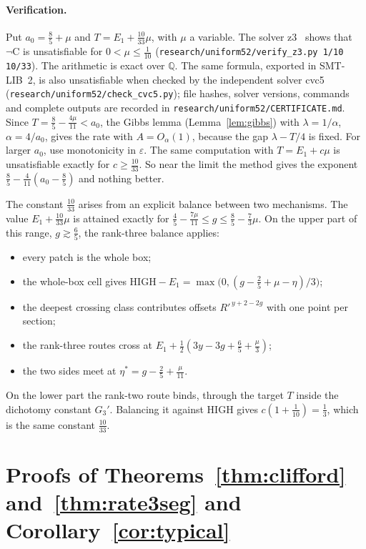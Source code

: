 \documentclass[aps,prx,twocolumn,superscriptaddress,nofootinbib,longbibliography]{revtex4-2}
\theoremstyle{plain}
\theoremstyle{definition}
\theoremstyle{remark}
\newcommand{\Q}{\mathbb{Q}}
\begin{document}
\paragraph{Verification.} Put $a_0=\tfrac85+\mu$ and $T=E_1+\tfrac{10}{33}\mu$, with $\mu$ a variable.
The solver z3~\cite{Z3} shows that $\neg\mathrm C$ is unsatisfiable for $0<\mu\le\tfrac1{10}$
(\texttt{research/uniform52/verify\_z3.py 1/10 10/33}). The arithmetic is exact over $\Q$. The same formula, exported in SMT-LIB~2, is also unsatisfiable when checked by the independent solver cvc5 (\texttt{research/uniform52/check\_cvc5.py}); file hashes, solver versions, commands and complete outputs are recorded in \texttt{research/uniform52/CERTIFICATE.md}. Since $T=\tfrac85-\tfrac{4\mu}{11}<a_0$, the Gibbs lemma
(Lemma~\ref{lem:gibbs}) with $\lambda=1/\alpha$, $\alpha=4/a_0$, gives the rate with $A=O_\alpha(1)$, because the gap $\lambda-T/4$ is fixed. For larger
$a_0$, use monotonicity in $\varepsilon$. The same computation with $T=E_1+c\mu$ is unsatisfiable exactly
for $c\ge\tfrac{10}{33}$. So near the limit the method gives the exponent $\tfrac85-\tfrac4{11}(a_0-\tfrac85)$
and nothing better.

The constant $\tfrac{10}{33}$ arises from an explicit balance between two mechanisms.
The value $E_1+\tfrac{10}{33}\mu$ is attained exactly for $\tfrac45-\tfrac{7\mu}{11}\le g\le\tfrac85-\tfrac73\mu$.
On the upper part of this range, $g\gtrsim\tfrac65$, the rank-three balance applies:
\begin{itemize}\setlength\itemsep{0pt}
\item every patch is the whole box;
\item the whole-box cell gives $\mathrm{HIGH}-E_1=\max\big(0,(g-\tfrac25+\mu-\eta)/3\big)$;
\item the deepest crossing class contributes offsets $R'^{\,y+2-2g}$ with one point per section;
\item the rank-three routes cross at $E_1+\tfrac12(3y-3g+\tfrac65+\tfrac\mu3)$;
\item the two sides meet at $\eta^*=g-\tfrac25+\tfrac\mu{11}$.
\end{itemize}
On the lower part the rank-two route binds, through the target $T$ inside the dichotomy constant $G_3'$.
Balancing it against $\mathrm{HIGH}$ gives $c(1+\tfrac1{10})=\tfrac13$, which is the same constant $\tfrac{10}{33}$.

\section{Proofs of Theorems~\ref{thm:clifford} and~\ref{thm:rate3seg} and Corollary~\ref{cor:typical}}\label{app:clifford}
\end{document}
